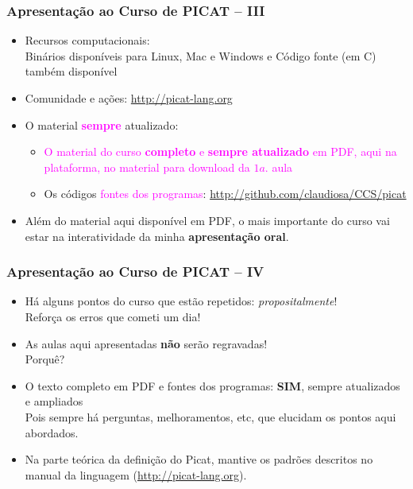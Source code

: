     
\begin{frame}[fragile]
  \frametitle{Apresentação ao Curso de PICAT -- III}
  \begin{itemize}
						
    \item Recursos computacionais:\\
    \pause 
    Binários disponíveis para Linux, Mac e Windows
     e Código fonte (em C) também disponível

    \item Comunidade e ações: \url{http://picat-lang.org}
    
    \pause
    \item O material \textcolor{magenta}{\textbf{sempre}} atualizado: 

    \pause
    \begin{itemize}
      \item  \textcolor{magenta}{O material do curso \textbf{completo} e \textbf{sempre atualizado} em PDF,
      aqui na plataforma, no material para download da $1a.$ aula}
      
     \item   Os códigos \textcolor{magenta}{fontes dos programas}:  \url{http://github.com/claudiosa/CCS/picat}
    \end{itemize}

			\item Além do material aqui disponível em PDF, o mais importante  do curso
			 vai estar na interatividade
			da minha \textbf{apresentação oral}. 
			
    
  \end{itemize}

\end{frame}

    
\begin{frame}[fragile]
  \frametitle{Apresentação ao Curso de PICAT -- IV}
  \begin{itemize}

    \item Há alguns pontos do curso que estão repetidos: \textit{propositalmente}!\\
    \pause
    Reforça os erros que cometi um dia!

    \pause
    \item As aulas aqui apresentadas \textbf{não} serão regravadas!\\Porquê?
        
    \pause 
    \item O texto completo em PDF e fontes dos programas: \textbf{SIM}, sempre atualizados e ampliados\\
    Pois sempre há perguntas, melhoramentos, etc, que elucidam os pontos aqui abordados.
    
    \pause 
    \item Na parte teórica da definição do Picat, mantive os padrões 
    descritos no manual da linguagem (\url{http://picat-lang.org}).
    
  \end{itemize}

\end{frame}

